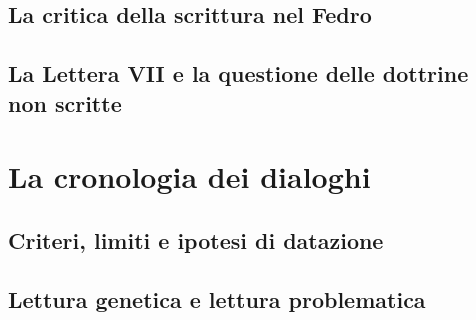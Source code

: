 \subsection{La critica della scrittura nel Fedro}

\subsection{La Lettera VII e la questione delle dottrine non scritte}

\section{La cronologia dei dialoghi}

\subsection{Criteri, limiti e ipotesi di datazione}

\subsection{Lettura genetica e lettura problematica}
